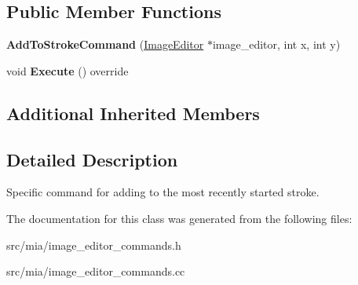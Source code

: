 \subsection*{Public Member Functions}
\begin{DoxyCompactItemize}
\item 
\mbox{\label{classimage__tools_1_1AddToStrokeCommand_a8e68a32c1e8812aa540719c2e21f8242}} 
{\bfseries Add\+To\+Stroke\+Command} (\hyperlink{classimage__tools_1_1ImageEditor}{Image\+Editor} $\ast$image\+\_\+editor, int x, int y)
\item 
\mbox{\label{classimage__tools_1_1AddToStrokeCommand_ad02db74e4d5d87b6dc5cad5cfc9dc9ec}} 
void {\bfseries Execute} () override
\end{DoxyCompactItemize}
\subsection*{Additional Inherited Members}


\subsection{Detailed Description}
Specific command for adding to the most recently started stroke. 

The documentation for this class was generated from the following files\+:\begin{DoxyCompactItemize}
\item 
src/mia/image\+\_\+editor\+\_\+commands.\+h\item 
src/mia/image\+\_\+editor\+\_\+commands.\+cc\end{DoxyCompactItemize}
